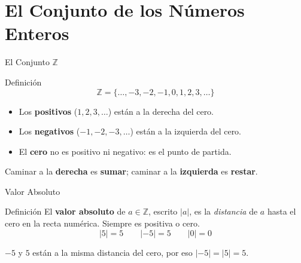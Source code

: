 \documentclass[aspectratio=169]{beamer}
\newcommand{\Z}{\mathbb{Z}}
\begin{document}
\begin{frame}[plain]
  \titlepage
\end{frame}

\section{El Conjunto de los Números Enteros}

\begin{frame}{El Conjunto $\Z$}
  \begin{block}{Definición}
    \[
      \Z = \{\dots, -3, -2, -1, 0, 1, 2, 3, \dots\}
    \]
    \begin{itemize}
      \item Los \textbf{positivos} ($1, 2, 3, \dots$) están a la derecha del cero.
      \item Los \textbf{negativos} ($-1, -2, -3, \dots$) están a la izquierda del cero.
      \item El \textbf{cero} no es positivo ni negativo: es el punto de partida.
    \end{itemize}
  \end{block}
  \vspace{6pt}
  \begin{center}
  \end{center}
  \vspace{2pt}
  \begin{mwextra}[Interpretación]
    Caminar a la \textbf{derecha} es \textbf{sumar}; caminar a la \textbf{izquierda} es \textbf{restar}.
  \end{mwextra}
\end{frame}

\begin{frame}{Valor Absoluto}
  \begin{block}{Definición}
    El \textbf{valor absoluto} de $a \in \Z$, escrito $|a|$, es la \emph{distancia} de $a$ hasta el cero en la recta numérica. Siempre es positiva o cero.
    \[
      |5| = 5 \qquad |-5| = 5 \qquad |0| = 0
    \]
  \end{block}
  \vspace{6pt}
  \begin{mwextra}
    $-5$ y $5$ están a la misma distancia del cero, por eso $|-5| = |5| = 5$.
  \end{mwextra}
\end{frame}
\end{document}
